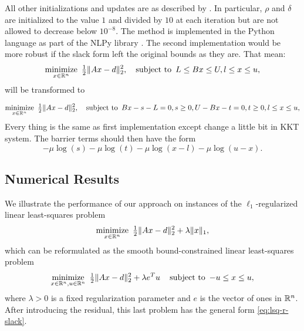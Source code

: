 \documentclass{amsart}
\begin{document}
All other initializations and updates are as described by
\cite{friedlander-orban-2012}. In particular, $\rho$ and $\delta$ are
initialized to the value $1$ and divided by $10$ at each iteration but are not
allowed to decrease below $10^{-8}$. The method is implemented in the Python
language as part of the \textsf{NLPy} library \citep{orban-2012}.
The second implementation would be more robust if the slack form left the original bounds as they are. That mean:
\begin{equation}
  \label{eq:lb}
  \displaystyle\mathop{\textup{minimize}}_{x \in \mathbb{R}^n} \ \tfrac{1}{2} \|Ax - d\|_2^2 ,
  \quad
  \mathop{\textup{subject to}} \ L \leq Bx \leq U,l \leq x \leq u,
\end{equation}
will be transformed to

\begin{equation}
  \label{eq:lbt}
  \displaystyle\mathop{\textup{minimize}}_{x \in \mathbb{R}^n} \ \tfrac{1}{2} \|Ax - d\|_2^2 ,
  \quad
  \mathop{\textup{subject to}} \ Bx-s-L=0, s \geq 0, U- Bx-t=0, t \geq 0,l \leq x \leq u,
\end{equation}
Every thing is the same as first implementation except change a little bit in KKT system.
The barrier terms should then have the form
	\[-\mu \log(s) - \mu\log(t) - \mu \log(x-l) - \mu \log(u-x).\]
\subsection{Numerical Results}

We illustrate the performance of our approach on instances of the
$\ell_1$-regularized linear least-squares problem
\begin{equation}
  \label{eq:l1reg}
  \displaystyle\mathop{\textup{minimize}}_{x \in \mathbb{R}^n} \ \tfrac{1}{2} \|Ax - d\|_2^2 + \lambda \|x\|_1,
\end{equation}
which can be reformulated as the smooth bound-constrained linear least-squares
problem
\begin{equation}
  \label{eq:l1reg-smooth}
  \displaystyle\mathop{\textup{minimize}}_{x \in \mathbb{R}^n, u \in \mathbb{R}^n} \ \tfrac{1}{2} \|Ax - d\|_2^2 + \lambda e^T u
  \quad
  \mathop{\textup{subject to}} \ -u \leq x \leq u,
\end{equation}
where $\lambda > 0$ is a fixed regularization parameter and $e$ is the vector
of ones in $\mathbb{R}^n$. After introducing the residual, this last problem has the
general form \eqref{eq:lsq-r-slack}.
\end{document}

